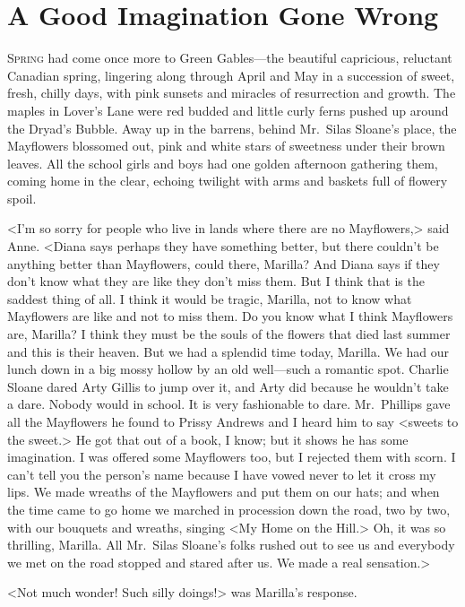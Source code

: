 \chapter{A Good Imagination Gone Wrong}

\lettrine[]{S}{pring} had come once more to Green Gables—the beautiful capricious, reluctant Canadian spring, lingering along through April and May in a succession of sweet, fresh, chilly days, with pink sunsets and miracles of resurrection and growth. The maples in Lover's Lane were red budded and little curly ferns pushed up around the Dryad's Bubble. Away up in the barrens, behind Mr.~Silas Sloane's place, the Mayflowers blossomed out, pink and white stars of sweetness under their brown leaves. All the school girls and boys had one golden afternoon gathering them, coming home in the clear, echoing twilight with arms and baskets full of flowery spoil.

<I'm so sorry for people who live in lands where there are no Mayflowers,> said Anne. <Diana says perhaps they have something better, but there couldn't be anything better than Mayflowers, could there, Marilla? And Diana says if they don't know what they are like they don't miss them. But I think that is the saddest thing of all. I think it would be tragic, Marilla, not to know what Mayflowers are like and not to miss them. Do you know what I think Mayflowers are, Marilla? I think they must be the souls of the flowers that died last summer and this is their heaven. But we had a splendid time today, Marilla. We had our lunch down in a big mossy hollow by an old well—such a romantic spot. Charlie Sloane dared Arty Gillis to jump over it, and Arty did because he wouldn't take a dare. Nobody would in school. It is very fashionable to dare. Mr.~Phillips gave all the Mayflowers he found to Prissy Andrews and I heard him to say <sweets to the sweet.> He got that out of a book, I know; but it shows he has some imagination. I was offered some Mayflowers too, but I rejected them with scorn. I can't tell you the person's name because I have vowed never to let it cross my lips. We made wreaths of the Mayflowers and put them on our hats; and when the time came to go home we marched in procession down the road, two by two, with our bouquets and wreaths, singing <My Home on the Hill.> Oh, it was so thrilling, Marilla. All Mr.~Silas Sloane's folks rushed out to see us and everybody we met on the road stopped and stared after us. We made a real sensation.>

<Not much wonder! Such silly doings!> was Marilla's response.

